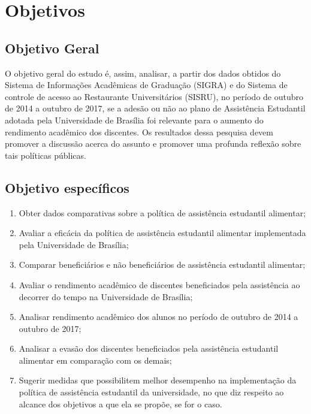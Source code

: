 \section{Objetivos}%
\subsection{Objetivo Geral}
O objetivo geral do estudo é, assim, analisar, a partir dos dados obtidos do Sistema de Informações Acadêmicas de Graduação (SIGRA) e do Sistema de controle de acesso ao Restaurante Universitários (SISRU), no período de outubro de 2014 a outubro de 2017, se a adesão ou não ao plano de Assistência Estudantil adotada pela Universidade de Brasília foi relevante para o aumento do rendimento acadêmico dos discentes. Os resultados dessa pesquisa devem promover a discussão acerca do assunto e promover uma profunda reflexão sobre tais políticas públicas.
\subsection{Objetivo específicos}
\begin{enumerate}
	\item Obter dados comparativas sobre a política de assistência estudantil alimentar;
	\item Avaliar a eficácia da política de assistência estudantil alimentar implementada pela Universidade de Brasília;
	\item Comparar beneficiários e não beneficiários de assistência estudantil alimentar;
	\item Avaliar o rendimento acadêmico de discentes beneficiados pela assistência ao decorrer do tempo na Universidade de Brasília; 
	\item Analisar rendimento acadêmico dos alunos no período de outubro de 2014 a outubro de 2017;
	\item Analisar a evasão dos discentes beneficiados pela assistência estudantil alimentar em comparação com os demais;
	\item Sugerir medidas que possibilitem melhor desempenho na implementação da política de assistência estudantil da universidade, no que diz respeito ao alcance dos objetivos a que ela se propõe, se for o caso.
\end{enumerate}%
